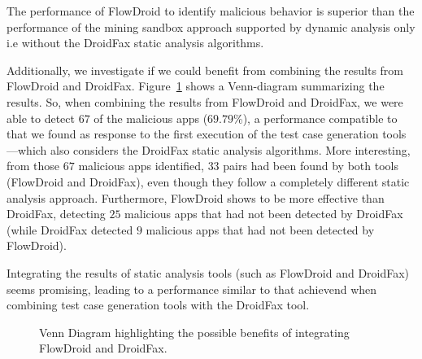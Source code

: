 
\begin{finding}
  The performance of FlowDroid to identify malicious behavior
  is superior than the performance of the
  mining sandbox approach supported by dynamic analysis only i.e without
  the DroidFax static analysis algorithms.
\end{finding}

Additionally, we investigate if we could benefit from combining
the results from FlowDroid and DroidFax. Figure~\ref{fig:venn-plot2} shows a
Venn-diagram summarizing the results. So, when combining
the results from FlowDroid and DroidFax, we were able to detect
$67$ of the malicious apps ($69.79$\%), a performance compatible
to that we found as response to the first execution of the
test case generation tools---which also considers the DroidFax
static analysis algorithms. More interesting, from those $67$
malicious apps identified, $33$ pairs had been found by
both tools (FlowDroid and DroidFax), even though they follow
a completely different static analysis approach. Furthermore,
FlowDroid shows to be more effective than DroidFax, detecting $25$ malicious
apps that had not been detected by DroidFax (while DroidFax detected $9$
malicious apps that had not been detected by FlowDroid).

\begin{finding}
  Integrating the results of static analysis tools
  (such as FlowDroid and DroidFax) seems promising,
  leading to a performance similar to that achievend
  when combining test case generation tools with the
  DroidFax tool. 
\end{finding}

\begin{figure}
  \caption{Venn Diagram highlighting the possible benefits of
    integrating FlowDroid and DroidFax.}
  \label{fig:venn-plot2}

\end{figure}

